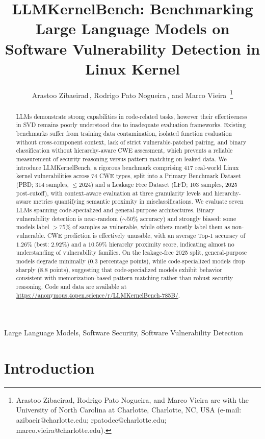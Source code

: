 \documentclass[lettersize,journal]{IEEEtran}
\title{LLMKernelBench: Benchmarking Large Language Models on Software Vulnerability Detection in Linux Kernel}
\author{Arastoo Zibaeirad\,\orcidlink{0009-0003-4213-9940}, 
        Rodrigo Pato Nogueira\,\orcidlink{0009-0007-8486-3805}, 
        and Marco Vieira\,\orcidlink{0000-0001-5103-8541}
\thanks{Arastoo Zibaeirad, Rodrigo Pato Nogueira, and Marco Vieira are with the University of North Carolina at Charlotte, Charlotte, NC, USA (e-mail: azibaeir@charlotte.edu; rpatodec@charlotte.edu; marco.vieira@charlotte.edu).}}
\begin{document}
\maketitle

\begin{abstract}
        \glspl{LLM} demonstrate strong capabilities in code-related tasks, however their effectiveness in \gls{SVD} remains poorly understood due to inadequate evaluation frameworks. Existing benchmarks suffer from training data contamination, isolated function evaluation without cross-component context, lack of strict vulnerable-patched pairing, and binary classification without hierarchy-aware \gls{CWE} assessment, which prevents a reliable measurement of security reasoning versus pattern matching on leaked data. We introduce LLMKernelBench, a rigorous benchmark comprising 417 real-world Linux kernel vulnerabilities across 74 \gls{CWE} types, split into  a Primary Benchmark Dataset (PBD; 314 samples, $\leq$2024) and a Leakage Free Dataset (LFD; 103 samples, 2025 post-cutoff), with context-aware evaluation at three granularity levels and hierarchy-aware metrics quantifying semantic proximity in misclassifications. We evaluate seven \glspl{LLM} spanning code-specialized and general-purpose architectures. Binary vulnerability detection is near-random ($\sim 50\%$ accuracy) and strongly biased: some models label $>75\%$ of samples as vulnerable, while others mostly label them as non-vulnerable. \gls{CWE} prediction is effectively unusable, with an average Top-1 accuracy of $1.26\%$ (best: $2.92\%$) and a $10.59\%$ hierarchy proximity score, indicating almost no understanding of vulnerability families. On the leakage-free 2025 split, general-purpose models degrade minimally ($0.3$ percentage points), while code-specialized models drop sharply ($8.8$ points), suggesting that code-specialized models exhibit behavior consistent with memorization-based pattern matching rather than robust security reasoning. Code and data are available at \url{https://anonymous.4open.science/r/LLMKernelBench-785B/}.

\end{abstract}

\glsresetall

\begin{IEEEkeywords}
	Large Language Models, Software Security, Software Vulnerability Detection
\end{IEEEkeywords}

\section{Introduction}
\end{document}
